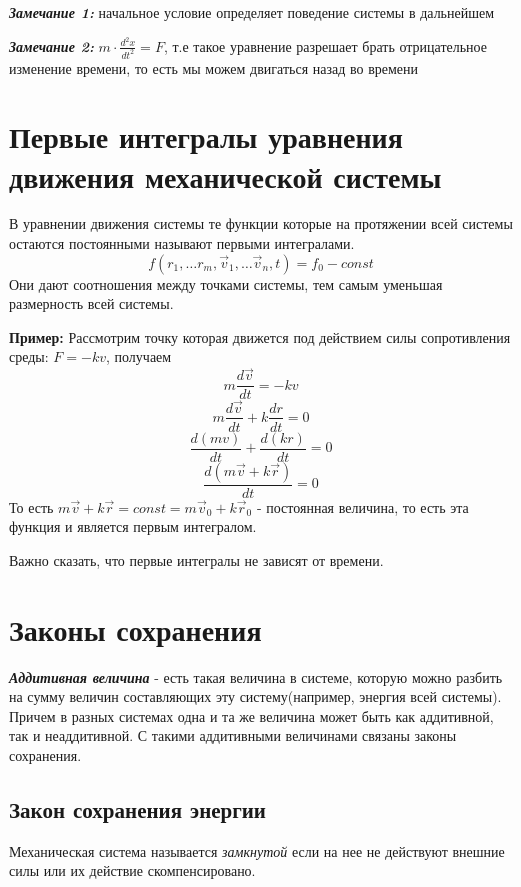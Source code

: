 \vspace{5px}

\textbf{\textit{Замечание 1:}} начальное условие определяет поведение системы в дальнейшем

\vspace{5px}

\textbf{\textit{Замечание 2:}} $m \cdot \frac{d^2x}{dt^2} = F$, т.е такое уравнение разрешает брать отрицательное изменение времени, то есть мы можем двигаться назад во времени
\section{Первые интегралы уравнения движения механической системы}
 В уравнении движения системы те функции которые на протяжении всей системы остаются постоянными называют первыми интегралами.
\[ f(r_1, \ldots r_m, \vec v_1, \ldots \vec v_n, t) = f_0 - const\]
Они дают соотношения между точками системы, тем самым уменьшая размерность всей системы.

\vspace{6px}

\textbf{Пример:} Рассмотрим точку которая движется под действием силы сопротивления среды: $F = -kv$, получаем
\[ m\frac{d\vec v}{dt} = -kv \]
\[m\frac{d\vec v}{dt} + k\frac{dr}{dt} = 0 \]
\[ \frac{d(mv)}{dt} + \frac{d(kr)}{dt} = 0 \]
\[ \frac{d(m\vec v + k\vec r)}{dt} = 0\]
То есть $m \vec v + k\vec r = const = m\vec v_0 + k\vec r_0$ - постоянная величина, то есть эта функция и является первым интегралом.

Важно сказать, что первые интегралы не зависят от времени.
\section{Законы сохранения}

  \textbf{\textit{Аддитивная величина}} - есть такая величина в системе, которую можно разбить на сумму величин составляющих эту систему(например, энергия всей системы). Причем в разных системах одна и та же величина может быть как аддитивной, так и неаддитивной. С такими аддитивными величинами связаны законы сохранения.


\subsection{Закон сохранения энергии}

 Механическая система называется \textit{замкнутой} если на нее не действуют внешние силы или их действие скомпенсировано.

